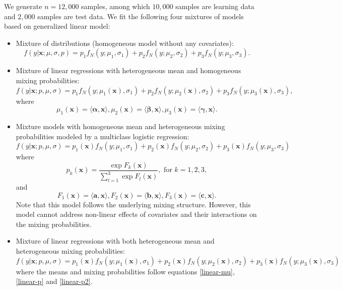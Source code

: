\documentclass[11pt]{article}
\numberwithin{equation}{section}
\def\bx{\boldsymbol{x}}
\begin{document}
We generate $n=12,000$ samples, among which $10,000$ samples are learning data and $2,000$ samples are test data.
We fit the following four mixtures of models based on generalized linear model:
\begin{itemize}
	\item 	Mixture of distributions (homogeneous model without any covariates):
	\begin{equation}\label{gaussian-0}
		f(y|\bx;\mu,\sigma,p)=p_1f_N(y;\mu_1,\sigma_1)+p_2f_N(y;\mu_2,\sigma_2)+p_3f_N(y;\mu_3,\sigma_3).
	\end{equation}

	\item 	Mixture of linear regressions with heterogeneous mean and homogeneous mixing probabilities:
\begin{equation}\label{gaussian-glm-mu}
	f(y|\bx;p,\mu,\sigma)=p_1f_N(y;\mu_1(\bx),\sigma_1)+p_2f_N(y;\mu_2(\bx),\sigma_2)+p_3f_N(y;\mu_3(\bx),\sigma_3),
\end{equation}
where
\begin{equation}\label{linear-mu}
	\mu_1(\bx)=\langle\boldsymbol{\alpha},\bx\rangle, \mu_2(\bx)=\langle\boldsymbol{\beta},\bx\rangle,\mu_3(\bx)=\langle\boldsymbol{\gamma},\bx\rangle.
\end{equation}

\item 	Mixture models with homogeneous mean and heterogeneous mixing probabilities modeled by a multiclass logistic regression:
\begin{equation}\label{gaussian-glm-p}
	f(y|\bx;p,\mu,\sigma)=p_1(\bx)f_N(y;\mu_1,\sigma_1)+p_2(\bx)f_N(y;\mu_2,\sigma_2)+p_3(\bx)f_N(y;\mu_3,\sigma_3)
\end{equation}
where
\begin{equation}\label{linear-p}
	p_k(\bx)=\frac{\exp{F_k(\bx)}}{\sum_{l=1}^{3}\exp{F_l(\bx)}}, \text{ for } k=1,2,3,
\end{equation}
and 
\begin{equation}\label{linear-p2}
	F_1(\bx)=\langle \boldsymbol{a},\bx\rangle, F_2(\bx)=\langle \boldsymbol{b},\bx\rangle,F_3(\bx)=\langle \boldsymbol{c},\bx\rangle.
\end{equation}
Note that this model follows the underlying mixing structure. However, this model cannot address non-linear effects of covariates and their interactions on the mixing probabilities.

	\item 	Mixture of linear regressions with both heterogeneous mean and heterogeneous mixing probabilities:
	\begin{equation}\label{gaussian-glm-b}
		f(y|\bx;p,\mu,\sigma)=p_1(\bx)f_N(y;\mu_1(\bx),\sigma_1)+p_2(\bx)f_N(y;\mu_2(\bx),\sigma_2)+p_3(\bx)f_N(y;\mu_3(\bx),\sigma_3)
	\end{equation}
where the means and mixing probabilities follow equations \eqref{linear-mu}, \eqref{linear-p} and \eqref{linear-p2}.
\end{itemize}
\end{document}
